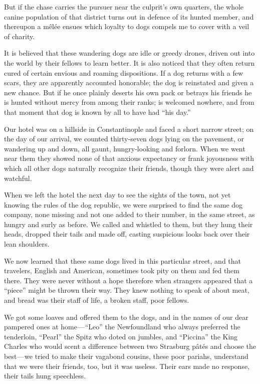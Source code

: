 \documentclass[12pt]{book}
\begin{document}
But if the chase carries the pursuer near the culprit’s own quarters, the whole
canine population of that district turns out in defence of its hunted member, and
thereupon a mêlée ensues which loyalty to dogs compels me to cover with a veil
of charity.

It is believed that these wandering dogs are idle or greedy drones, driven
out into the world by their fellows to learn better. It is also noticed that they
often return cured of certain envious and roaming dispositions. If a dog returns
with a few scars, they are apparently accounted honorable; the dog is reinstated
and given a new chance. But if he once plainly deserts his own pack or betrays
his friends he is hunted without mercy from among their ranks; is welcomed
nowhere, and from that moment that dog is known by all to have had “his day.”

Our hotel was on a hillside in Constantinople and faced a short narrow street;
on the day of our arrival, we counted thirty‐seven dogs lying on the pavement, or
wandering up and down, all gaunt, hungry‐looking and forlorn. When we went
near them they showed none of that anxious expectancy or frank joyousness with
which all other dogs naturally recognize their friends, though they were alert and
watchful.

When we left the hotel the next day to see the sights of the town, not yet
knowing the rules of the dog republic, we were surprised to find the same dog
company, none missing and not one added to their number, in the same street, as
hungry and surly as before. We called and whistled to them, but they hung their
heads, dropped their tails and made off, casting suspicious looks back over their
lean shoulders.

We now learned that these same dogs lived in this particular street, and that
travelers, English and American, sometimes took pity on them and fed them there.
They were never without a hope therefore when strangers appeared that a “piece”
might be thrown their way. They knew nothing to speak of about meat, and bread
was their staff of life, a broken staff, poor fellows.

We got some loaves and offered them to the dogs, and in the names of our
dear pampered ones at home — “Leo” the Newfoundland who always preferred
the tenderloin, “Pearl” the Spitz who doted on jumbles, and “Piccina” the King
Charles who would scent a difference between two Strasburg pâtés and choose the
best — we tried to make their vagabond cousins, these poor pariahs, understand
that we were their friends, too, but it was useless. Their ears made no response,
their tails hung speechless.
\end{document}
